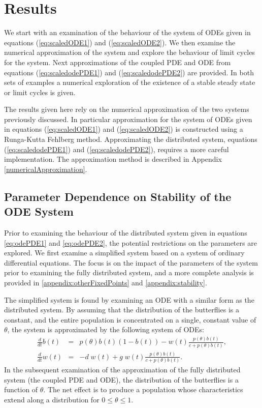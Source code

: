 \documentclass[review,authoryear]{elsarticle}
\begin{document}
\section{Results}
\label{section:results}

We start with an
examination of the behaviour of the system of ODEs given in equations
(\ref{eq:scaledODE1}) and (\ref{eq:scaledODE2}). We then examine the numerical
approximation of the system and explore the behaviour of limit cycles for the system. Next approximations
of the coupled PDE and ODE from equations (\ref{eq:scaledodePDE1}) and
(\ref{eq:scaledodePDE2}) are provided. In both sets of examples a
numerical exploration of the existence of a stable steady state or
limit cycles is given.

The results given here rely on the numerical approximation of the two
systems previously discussed. In particular approximation for the
system of ODEs given in equations (\ref{eq:scaledODE1}) and
(\ref{eq:scaledODE2}) is constructed using a Runga-Kutta Fehlberg
method. Approximating the distributed system, equations
(\ref{eq:scaledodePDE1}) and (\ref{eq:scaledodePDE2}), requires a more
careful implementation. The approximation method is described in
Appendix \ref{numericalApproximation}.

\subsection{Parameter Dependence on Stability of the ODE System}
\label{subsection:parameters}

Prior to examining the behaviour of the distributed system given in
equations \ref{eq:odePDE1} and \ref{eq:odePDE2}, the potential
restrictions on the parameters are explored. We first examine a
simplified system based on a system of ordinary differential
equations.  The focus is on the impact of the parameters of the
system prior to examining the fully distributed system, and a more complete analysis is provided in 
\ref{appendix:otherFixedPoints} and \ref{appendix:stability}.

The simplified system is found by examining an ODE with a similar form
as the distributed system. By assuming that the distribution of the
butterflies is a constant, and the entire population is concentrated on a single, constant 
value of $\theta$, the system is approximated by the following system
of ODEs:
\begin{eqnarray}
  \label{eq:scaledODE1}
  \frac{d}{dt} b(t) & = &
      p(\theta) b(t) (1 - b(t))
      -  w(t) \frac{p(\theta) b(t)}{c+p(\theta)b(t)}, \\
  \label{eq:scaledODE2}
  \frac{d}{dt} w(t) & = & -d \; w(t) +
       g \; w(t) \frac{p(\theta) b(t) }{c + p(\theta) b(t)}.
\end{eqnarray}
In the subsequent examination of the approximation of the fully distributed system (the coupled PDE and ODE), the distribution of the butterflies is a function of $\theta$. The net effect is to produce a population whose characteristics extend along a distribution for $0\leq\theta\leq 1$.
\end{document}

